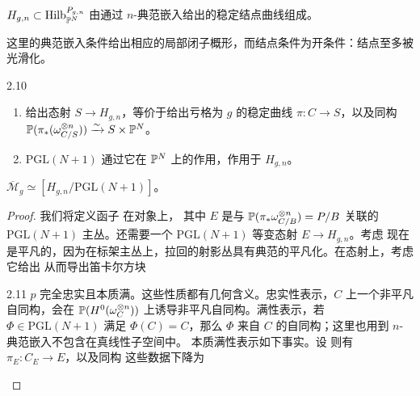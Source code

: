 \begin{definition}\label{def:2.11}
$H_{g,n}\subset\operatorname{Hilb}_{\mathbb P^N}^{P_{g,n}}$ 由通过 $n$-典范嵌入给出的稳定结点曲线组成。
\end{definition}
这里的典范嵌入条件给出相应的局部闭子概形，而结点条件为开条件：结点至多被光滑化。
\begin{Note}{2.10}
\begin{enumerate}[label=(\alph*)]
\item 给出态射 $S\to H_{g,n}$，等价于给出亏格为 $g$ 的稳定曲线 $\pi:C\to S$，以及同构 $\mathbb P(\pi_*(\omega_{C/S}^{\otimes n}))\xrightarrow{\sim}S\times\mathbb P^N$。
\item $\mathrm{PGL}(N+1)$ 通过它在 $\mathbb P^N$ 上的作用，作用于 $H_{g,n}$。
\end{enumerate}
\end{Note}
\begin{theorem}\label{thm:2.10}
$\overline{\mathcal M}_g\simeq[H_{g,n}/\mathrm{PGL}(N+1)]$。
\end{theorem}
\begin{proof}
我们将定义函子
在对象上，
其中 $E$ 是与 $\mathbb P(\pi_*\omega_{C/B}^{\otimes n})=P/B$ 关联的 $\mathrm{PGL}(N+1)$ 主丛。还需要一个 $\mathrm{PGL}(N+1)$ 等变态射 $E\to H_{g,n}$。考虑
现在
是平凡的，因为在标架主丛上，拉回的射影丛具有典范的平凡化。在态射上，考虑
它给出
从而导出笛卡尔方块
\begin{Note}{2.11}
$p$ 完全忠实且本质满。这些性质都有几何含义。忠实性表示，$C$ 上一个非平凡自同构，会在 $\mathbb P(H^0(\omega_C^{\otimes n}))$ 上诱导非平凡自同构。满性表示，若 $\Phi\in\mathrm{PGL}(N+1)$ 满足 $\Phi(C)=C$，那么 $\Phi$ 来自 $C$ 的自同构；这里也用到 $n$-典范嵌入不包含在真线性子空间中。
本质满性表示如下事实。设
则有 $\pi_E:C_E\to E$，以及同构
这些数据下降为
\end{Note}

\end{proof}
